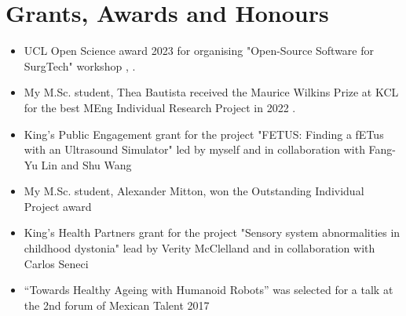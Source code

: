 \documentclass{mycv}
\begin{document}
\section{Grants, Awards and Honours}
\begin{itemize}

\item UCL Open Science award 2023 for organising "Open-Source Software for SurgTech" workshop \href{https://blogs.ucl.ac.uk/open-access/2023/10/26/open-science-scholarship-awards-winners/}{\faExternalLink*}, \href{https://github.com/oss-for-surgtech}{\faGithub*}
.

\item My M.Sc. student, Thea Bautista received the Maurice Wilkins Prize at KCL for the best MEng Individual Research Project in 2022 \href{https://twitter.com/_mxochicale/status/1564571097932402688}{\faExternalLink*} .

\item King's Public Engagement grant for the project "FETUS: Finding a fETus with an Ultrasound Simulator" led by myself and in collaboration with Fang-Yu Lin and Shu Wang \href{https://cai4cai.ml/post/2021-01-07-miguelpegrant/}{\faExternalLink*} 

\item My M.Sc. student, Alexander Mitton, won the Outstanding Individual Project award 
 \href{https://www.kcl.ac.uk/news/mscmres-healthcare-technologies-award-student-prizes-for-outstanding-performance-and-contributions-to-student-life}{\faExternalLink*} 

\item King's Health Partners grant for the project "Sensory system abnormalities in childhood dystonia" lead by Verity McClelland and in collaboration with Carlos Seneci \href{https://kclpure.kcl.ac.uk/portal/en/persons/miguel-angel-perez-xochicale(cca72683-31b7-496a-8aeb-181fd9d6a8f3)/projects.html}{\faExternalLink*} 

\item ``Towards Healthy Ageing with Humanoid Robots'' was selected for a talk at the 2nd forum of Mexican Talent 2017 \href{https://github.com/mxochicale/InnovationMatchMX/tree/master/2017}{\faExternalLink*} \href{https://github.com/mxochicale/InnovationMatchMX/blob/master/2017/presentation/IMMX-MA-0058.pdf}{\faFilePdf} \href{https://www.youtube.com/watch?v=wNWzpdXdm5U}{\faYoutube} 


\end{itemize}
\end{document}
